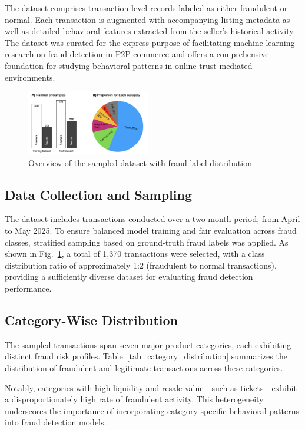 \documentclass[sigconf]{acmart}
\begin{document}
The dataset comprises transaction-level records labeled as either fraudulent or normal. Each transaction is augmented with accompanying listing metadata as well as detailed behavioral features extracted from the seller's historical activity. The dataset was curated for the express purpose of facilitating machine learning research on fraud detection in P2P commerce and offers a comprehensive foundation for studying behavioral patterns in online trust-mediated environments.

\begin{figure}[t!]
  \centering
  \includegraphics[width=0.48\textwidth]{figures/fig_dataset.png}
  \caption{Overview of the sampled dataset with fraud label distribution}
  \label{fig_dataset}
\end{figure}


\subsection{Data Collection and Sampling}
The dataset includes transactions conducted over a two-month period, from April to May 2025. To ensure balanced model training and fair evaluation across fraud classes, stratified sampling based on ground-truth fraud labels was applied. As shown in Fig.~\ref{fig_dataset}, a total of 1,370 transactions were selected, with a class distribution ratio of approximately 1:2 (fraudulent to normal transactions), providing a sufficiently diverse dataset for evaluating fraud detection performance.

\subsection{Category-Wise Distribution}
The sampled transactions span seven major product categories, each exhibiting distinct fraud risk profiles. Table~\ref{tab_category_distribution} summarizes the distribution of fraudulent and legitimate transactions across these categories.

Notably, categories with high liquidity and resale value—such as tickets—exhibit a disproportionately high rate of fraudulent activity. This heterogeneity underscores the importance of incorporating category-specific behavioral patterns into fraud detection models.
\end{document}
